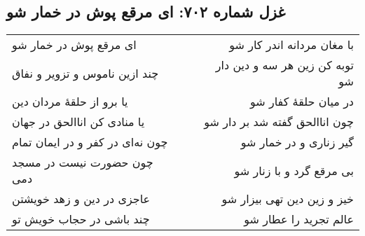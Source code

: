 \begin{center}
\section*{غزل شماره ۷۰۲: ای مرقع پوش در خمار شو}
\label{sec:702}
\begin{longtable}{l p{0.5cm} r}
ای مرقع پوش در خمار شو
&&
با مغان مردانه اندر کار شو
\\
چند ازین ناموس و تزویر و نفاق
&&
توبه کن زین هر سه و دین دار شو
\\
یا برو از حلقهٔ مردان دین
&&
در میان حلقهٔ کفار شو
\\
یا منادی کن اناالحق در جهان
&&
چون اناالحق گفته شد بر دار شو
\\
چون نه‌ای در کفر و در ایمان تمام
&&
گیر زناری و در خمار شو
\\
چون حضورت نیست در مسجد دمی
&&
بی مرقع گرد و با زنار شو
\\
عاجزی در دین و زهد خویشتن
&&
خیز و زین دین تهی بیزار شو
\\
چند باشی در حجاب خویش تو
&&
عالم تجرید را عطار شو
\\
\end{longtable}
\end{center}
